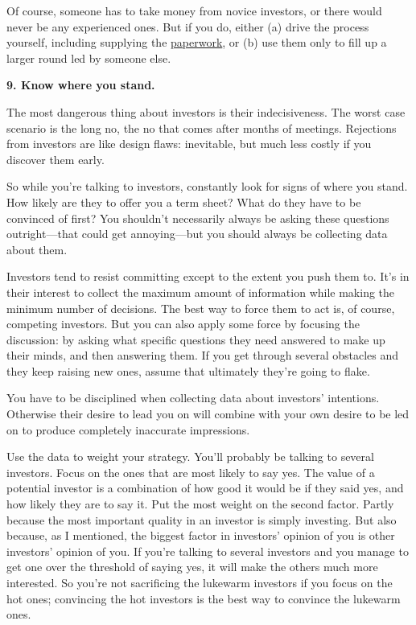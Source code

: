 \documentclass[12pt]{book}
\begin{document}
Of course, someone has to take money from novice investors, or there
would never be any experienced ones. But if you do, either (a) drive the
process yourself, including supplying the
\href{http://ycombinator.com/seriesaa.html}{paperwork}, or (b) use them
only to fill up a larger round led by someone else.

\textbf{9. Know where you stand.}

The most dangerous thing about investors is their indecisiveness. The
worst case scenario is the long no, the no that comes after months of
meetings. Rejections from investors are like design flaws: inevitable,
but much less costly if you discover them early.

So while you're talking to investors, constantly look for signs of where
you stand. How likely are they to offer you a term sheet? What do they
have to be convinced of first? You shouldn't necessarily always be
asking these questions outright---that could get annoying---but you
should always be collecting data about them.

Investors tend to resist committing except to the extent you push them
to. It's in their interest to collect the maximum amount of information
while making the minimum number of decisions. The best way to force them
to act is, of course, competing investors. But you can also apply some
force by focusing the discussion: by asking what specific questions they
need answered to make up their minds, and then answering them. If you
get through several obstacles and they keep raising new ones, assume
that ultimately they're going to flake.

You have to be disciplined when collecting data about investors'
intentions. Otherwise their desire to lead you on will combine with your
own desire to be led on to produce completely inaccurate impressions.

Use the data to weight your strategy. You'll probably be talking to
several investors. Focus on the ones that are most likely to say yes.
The value of a potential investor is a combination of how good it would
be if they said yes, and how likely they are to say it. Put the most
weight on the second factor. Partly because the most important quality
in an investor is simply investing. But also because, as I mentioned,
the biggest factor in investors' opinion of you is other investors'
opinion of you. If you're talking to several investors and you manage to
get one over the threshold of saying yes, it will make the others much
more interested. So you're not sacrificing the lukewarm investors if you
focus on the hot ones; convincing the hot investors is the best way to
convince the lukewarm ones.
\end{document}
